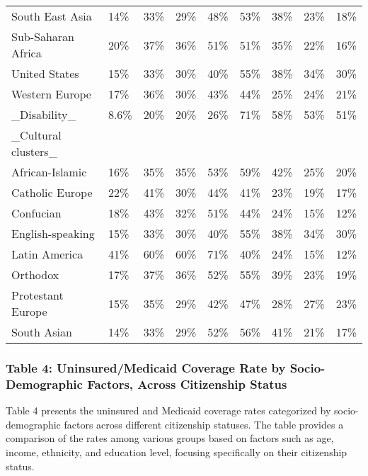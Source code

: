\documentclass[
]{article}
\begin{document}
\begin{longtable}[t]{lllllllll}
South East Asia & 14\% & 33\% & 29\% & 48\% & 53\% & 38\% & 23\% & 18\%\\
Sub-Saharan Africa & 20\% & 37\% & 36\% & 51\% & 51\% & 35\% & 22\% & 16\%\\
United States & 15\% & 33\% & 30\% & 40\% & 55\% & 38\% & 34\% & 30\%\\
\addlinespace
Western Europe & 17\% & 36\% & 30\% & 43\% & 44\% & 25\% & 24\% & 21\%\\
\_Disability\_ & 8.6\% & 20\% & 20\% & 26\% & 71\% & 58\% & 53\% & 51\%\\
\_Cultural clusters\_ &  &  &  &  &  &  &  & \\
African-Islamic & 16\% & 35\% & 35\% & 53\% & 59\% & 42\% & 25\% & 20\%\\
Catholic Europe & 22\% & 41\% & 30\% & 44\% & 41\% & 23\% & 19\% & 17\%\\
\addlinespace
Confucian & 18\% & 43\% & 32\% & 51\% & 44\% & 24\% & 15\% & 12\%\\
English-speaking & 15\% & 33\% & 30\% & 40\% & 55\% & 38\% & 34\% & 30\%\\
Latin America & 41\% & 60\% & 60\% & 71\% & 40\% & 24\% & 15\% & 12\%\\
Orthodox & 17\% & 37\% & 36\% & 52\% & 55\% & 39\% & 23\% & 19\%\\
Protestant Europe & 15\% & 35\% & 29\% & 42\% & 47\% & 28\% & 27\% & 23\%\\
\addlinespace
South Asian & 14\% & 33\% & 29\% & 52\% & 56\% & 41\% & 21\% & 17\%\\*
\end{longtable}
\endgroup{}

\hypertarget{table-4-uninsuredmedicaid-coverage-rate-by-socio-demographic-factors-across-citizenship-status}{%
\subsubsection{Table 4: Uninsured/Medicaid Coverage Rate by
Socio-Demographic Factors, Across Citizenship
Status}\label{table-4-uninsuredmedicaid-coverage-rate-by-socio-demographic-factors-across-citizenship-status}}

Table 4 presents the uninsured and Medicaid coverage rates categorized
by socio-demographic factors across different citizenship statuses. The
table provides a comparison of the rates among various groups based on
factors such as age, income, ethnicity, and education level, focusing
specifically on their citizenship status.
\end{document}
